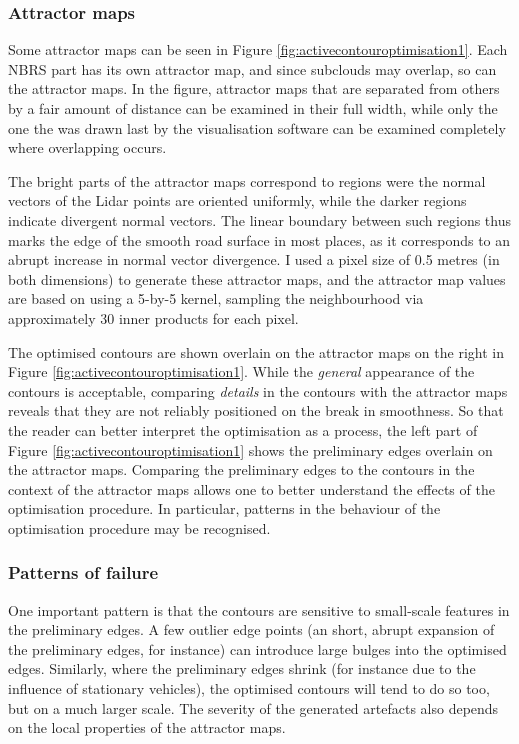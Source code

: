 \subsubsection{Attractor maps}

Some attractor maps can be seen in Figure \ref{fig:activecontouroptimisation1}. Each NBRS part has its own attractor map, and since subclouds may overlap, so can the attractor maps. In the figure, attractor maps that are separated from others by a fair amount of distance can be examined in their full width, while only the one the was drawn last by the visualisation software can be examined completely where overlapping occurs.

The bright parts of the attractor maps correspond to regions were the normal vectors of the Lidar points are oriented uniformly, while the darker regions indicate divergent normal vectors. The linear boundary between such regions thus marks the edge of the smooth road surface in most places, as it corresponds to an abrupt increase in normal vector divergence. I used a pixel size of 0.5 metres (in both dimensions) to generate these attractor maps, and the attractor map values are based on using a 5-by-5 kernel, sampling the neighbourhood via approximately 30 inner products for each pixel.

The optimised contours are shown overlain on the attractor maps on the right in Figure \ref{fig:activecontouroptimisation1}. While the \textit{general} appearance of the contours is acceptable, comparing \textit{details} in the contours with the attractor maps reveals that they are not reliably positioned on the break in smoothness. So that the reader can better interpret the optimisation as a process, the left part of Figure \ref{fig:activecontouroptimisation1} shows the preliminary edges overlain on the attractor maps. Comparing the preliminary edges to the contours in the context of the attractor maps allows one to better understand the effects of the optimisation procedure. In particular, patterns in the behaviour of the optimisation procedure may be recognised.

\subsubsection{Patterns of failure}

One important pattern is that the contours are sensitive to small-scale features in the preliminary edges. A few outlier edge points (an short, abrupt expansion of the preliminary edges, for instance) can introduce large bulges into the optimised edges. Similarly, where the preliminary edges shrink (for instance due to the influence of stationary vehicles), the optimised contours will tend to do so too, but on a much larger scale. The severity of the generated artefacts also depends on the local properties of the attractor maps.

